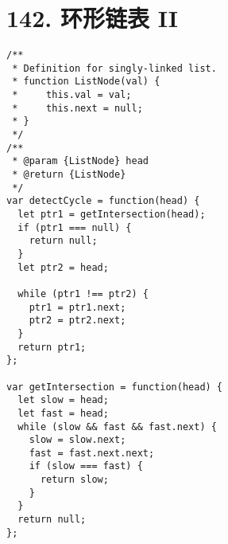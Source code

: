\newpage
\section{142. 环形链表 II}
\label{leetcode:142}

\begin{verbatim}
/**
 * Definition for singly-linked list.
 * function ListNode(val) {
 *     this.val = val;
 *     this.next = null;
 * }
 */
/**
 * @param {ListNode} head
 * @return {ListNode}
 */
var detectCycle = function(head) {
  let ptr1 = getIntersection(head);
  if (ptr1 === null) {
    return null;
  }
  let ptr2 = head;

  while (ptr1 !== ptr2) {
    ptr1 = ptr1.next;
    ptr2 = ptr2.next;
  }
  return ptr1;
};

var getIntersection = function(head) {
  let slow = head;
  let fast = head;
  while (slow && fast && fast.next) {
    slow = slow.next;
    fast = fast.next.next;
    if (slow === fast) {
      return slow;
    }
  }
  return null;
};
\end{verbatim}
